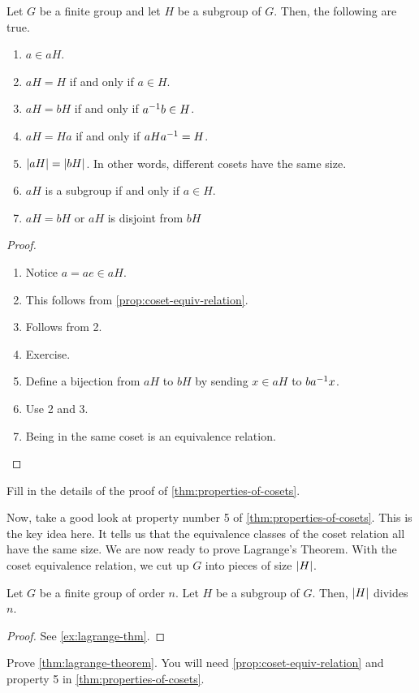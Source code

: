 \documentclass[./main.tex]{subfiles}
\begin{document}
\begin{theorem}
\label{thm:properties-of-cosets}
    Let $G$ be a finite group and let $H$ be a subgroup of $G$. Then, the following are true.

    \begin{enumerate}
        \item $a \in aH$.
        \item $aH = H$ if and only if $a \in H$.
        \item $aH = bH$ if and only if $a^{-1} b \in H$.
        \item $aH = Ha$ if and only if $aHa^{-1} = H$.
        \item $\abs{aH} = \abs{bH}$. In other words, different cosets have the same size.
        \item $aH$ is a subgroup if and only if $a \in H$.
        \item $aH = bH$ or $aH$ is disjoint from $bH$
    \end{enumerate}
\end{theorem}
\begin{proof}
    \begin{enumerate}
        \item Notice $a = ae \in aH$.
        \item This follows from \cref{prop:coset-equiv-relation}.
        \item Follows from 2.
        \item Exercise. 
        \item Define a bijection from $aH$ to $bH$ by sending $x \in aH$ to $ba^{-1} x$.
        \item Use 2 and 3.
        \item Being in the same coset is an equivalence relation.
    \end{enumerate}
\end{proof}
\begin{exercise}
    Fill in the details of the proof of \cref{thm:properties-of-cosets}.
\end{exercise}

Now, take a good look at property number 5 of \cref{thm:properties-of-cosets}.
This is the key idea here. It tells us that the equivalence classes of the coset
relation all have the same size. We are now ready to prove Lagrange's Theorem. With
the coset equivalence relation, we cut up $G$ into pieces of size $\abs{H}$. 
\begin{theorem}
\label{thm:lagrange-theorem}
    Let $G$ be a finite group of order $n$. Let $H$ be a subgroup of $G$. Then,
    $\abs{H}$ divides $n$.
\end{theorem}
\begin{proof}
    See \cref{ex:lagrange-thm}. 
\end{proof}
\begin{exercise}
\label{ex:lagrange-thm}
    Prove \cref{thm:lagrange-theorem}. You will need
    \cref{prop:coset-equiv-relation} and property 5 in
    \cref{thm:properties-of-cosets}.
\end{exercise}
\end{document}
